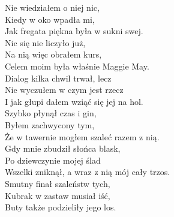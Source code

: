 Nie wiedziałem o niej nic, \\
Kiedy w oko wpadła mi, \\
Jak fregata piękna była w sukni swej. \\
Nic się nie liczyło już, \\
Na nią więc obrałem kurs, \\
Celem moim była właśnie Maggie May. \\

Dialog kilka chwil trwał, lecz \\
Nie wyczułem w czym jest rzecz \\
I jak głupi dałem wziąć się jej na hol. \\
Szybko płynął czas i gin, \\
Byłem zachwycony tym, \\
Że w tawernie mogłem szaleć razem z nią. \\

Gdy mnie zbudził słońca blask, \\
Po dziewczynie mojej ślad \\
Wszelki zniknął, a wraz z nią mój cały trzos. \\
Smutny finał szaleństw tych, \\
Kubrak w zastaw musiał iść, \\
Buty także podzieliły jego los.